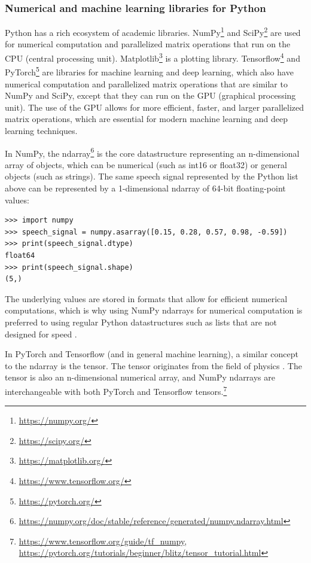\documentclass[report.tex]{subfiles}
\begin{document}
\subsubsection{Numerical and machine learning libraries for Python}

Python has a rich ecosystem of academic libraries. NumPy\footnote{\url{https://numpy.org/}} and SciPy\footnote{\url{https://scipy.org/}} are used for numerical computation and parallelized matrix operations that run on the CPU (central processing unit). Matplotlib\footnote{\url{https://matplotlib.org/}} is a plotting library. Tensorflow\footnote{\url{https://www.tensorflow.org/}} and PyTorch\footnote{\url{https://pytorch.org/}} are libraries for machine learning and deep learning, which also have numerical computation and parallelized matrix operations that are similar to NumPy and SciPy, except that they can run on the GPU (graphical processing unit). The use of the GPU allows for more efficient, faster, and larger parallelized matrix operations, which are essential for modern machine learning and deep learning techniques.

In NumPy, the ndarray\footnote{\url{https://numpy.org/doc/stable/reference/generated/numpy.ndarray.html}} is the core datastructure representing an n-dimensional array of objects, which can be numerical (such as int16 or float32) or general objects (such as strings). The same speech signal represented by the Python list above can be represented by a 1-dimensional ndarray of 64-bit floating-point values:

\begin{listing}[!ht]
\centering
\begin{BVerbatim}
>>> import numpy
>>> speech_signal = numpy.asarray([0.15, 0.28, 0.57, 0.98, -0.59])
>>> print(speech_signal.dtype)
float64
>>> print(speech_signal.shape)
(5,)
\end{BVerbatim}
\end{listing}

The underlying values are stored in formats that allow for efficient numerical computations, which is why using NumPy ndarrays for numerical computation is preferred to using regular Python datastructures such as lists that are not designed for speed \parencite{ndarrayfast}.

In PyTorch and Tensorflow (and in general machine learning), a similar concept to the ndarray is the tensor. The tensor originates from the field of physics \parencite{whatistensor}. The tensor is also an n-dimensional numerical array, and NumPy ndarrays are interchangeable with both PyTorch and Tensorflow tensors.\footnote{\url{https://www.tensorflow.org/guide/tf_numpy}, \url{https://pytorch.org/tutorials/beginner/blitz/tensor_tutorial.html}}
\end{document}
